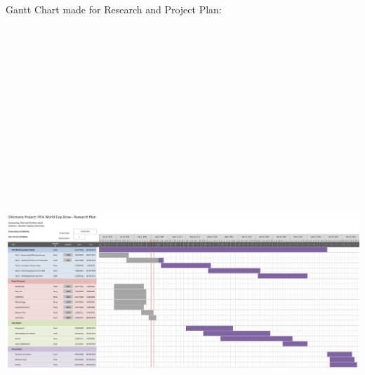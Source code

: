 \documentclass[11pt,a4paper]{article}
\begin{document}
Gantt Chart made for Research and Project Plan:

\includegraphics[angle=90,height=20cm,width=\linewidth]{ProposalGantt.PNG}


\newpage



\end{document}
